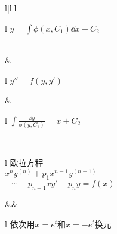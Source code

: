 \begin{table}[!htp]
\begin{tblr}{l|l|l}
\begin{tblr}{l}
				\(y = \int \phi(x, C_1) \dd{x} + C_2\) \\
			\end{tblr} \\  %
			& \begin{tblr}{l}
				\(y'' = f(y, y')\) \\ %
			\end{tblr}
			& \begin{tblr}{l}
				\(\int \frac{\dd{y}}{\phi(y,C_1)} = x + C_2\) \\ %
			\end{tblr}
		\\ \hline
		\begin{tblr}{l}
			欧拉方程 \\ %
			\(x^n y^{(n)} + p_1 x^{n-1} y^{(n-1)}\) \\
			\(+ \dotsb + p_{n-1} x y' + p_n y = f(x)\) \\
		\end{tblr}
			&& \begin{tblr}{l}
				依次用\(x=e^t\)和\(x=-e^t\)换元 \\
			\end{tblr}
		\\ \hline
	\end{tblr}
\end{table}
